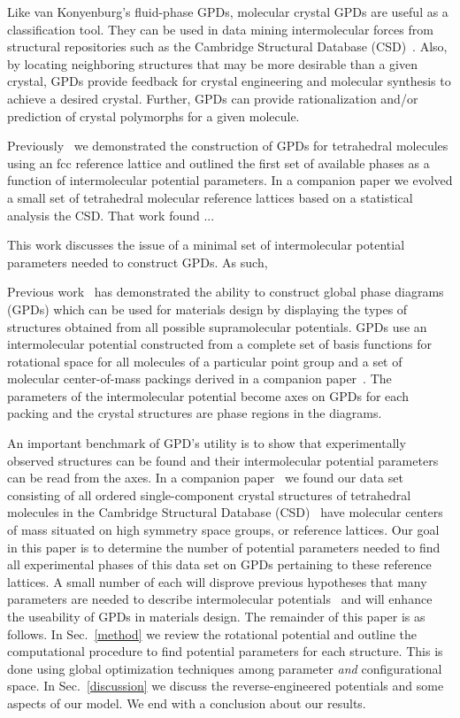 \documentclass[preprint]{revtex4}
\begin{document}
Like van Konyenburg's fluid-phase GPDs, molecular crystal GPDs are useful as a classification tool.  They can be used in data mining intermolecular forces from structural repositories such as the Cambridge Structural Database (CSD)~\cite{Allen02}.  Also, by locating neighboring structures that may be more desirable than a given crystal, GPDs provide feedback for crystal engineering and molecular synthesis to achieve a desired crystal. Further, GPDs can provide rationalization and/or prediction of crystal polymorphs for a given molecule.

Previously~\cite{Mettes04} we demonstrated the construction of GPDs for tetrahedral molecules using an fcc reference lattice and outlined the first set of available phases as a function of intermolecular potential parameters.  In a companion paper\cite{McClurg08} we evolved a small set of tetrahedral molecular reference lattices based on a statistical analysis the CSD.  That work found ...

This work discusses the issue of a minimal set of intermolecular potential parameters needed to construct GPDs.  As such,  






Previous work~\cite{Keith04c,Mettes04} has demonstrated the ability
to construct global phase diagrams (GPDs) which can be used for
materials design by displaying the types of structures obtained from
all possible supramolecular potentials. GPDs use an
intermolecular potential constructed from a complete set of basis
functions for rotational space for all molecules of a particular
point group and a set of molecular center-of-mass packings derived
in a companion paper~\cite{McClurg08}. The parameters of the
intermolecular potential become axes on GPDs for each packing and
the crystal structures are phase regions in the diagrams.

An important benchmark of GPD's utility is to show that
experimentally observed structures can be found and their
intermolecular potential parameters can be read from the axes.
In a companion paper~\cite{McClurg08} we found our data set consisting of
all ordered single-component crystal structures of
tetrahedral molecules in the Cambridge Structural Database
(CSD)~\cite{Allen02} have molecular centers of mass situated on
high symmetry space groups, or reference lattices. Our goal
in this paper is to determine the number of potential parameters needed
to find all experimental phases of this data set on GPDs pertaining to these
reference lattices.  A small number of each will
disprove previous hypotheses that many parameters are
needed to describe intermolecular potentials~\cite{Briels80}
and will enhance the useability of GPDs in
materials design. The remainder of this paper is as follows. In Sec.~\ref{method} we
review the rotational potential and outline the computational
procedure to find potential parameters for each structure. This
is done using global optimization techniques among parameter
\emph{and} configurational space. In Sec.~\ref{discussion} we
discuss the reverse-engineered potentials and some aspects of our model. We end with a conclusion
about our results.
\end{document}
